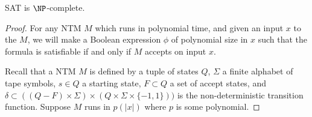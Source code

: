 \documentclass[runningheads,a4paper]{llncs}
\begin{document}
\begin{theorem}
SAT is $\NP$-complete.
\end{theorem}

\begin{proof}
For any NTM $M$ which runs in polynomial time, and given an input $x$ to the $M$, we will make a Boolean expression $\phi$ of polynomial size in $x$ such that the formula is satisfiable if and only if $M$ accepts on input $x$. 

Recall that a NTM $M$ is defined by a tuple of states $Q$, $\Sigma$ a finite alphabet of tape symbols, $s \in Q$ a starting state, $F \subset Q$ a set of accept states, and $\delta \subset ((Q - F) \times \Sigma) \times (Q \times \Sigma \times \{ -1, 1\}))$ is the non-deterministic transition function. Suppose $M$ runs in $p(|x|)$ where $p$ is some polynomial.


\end{proof}
\end{document}
